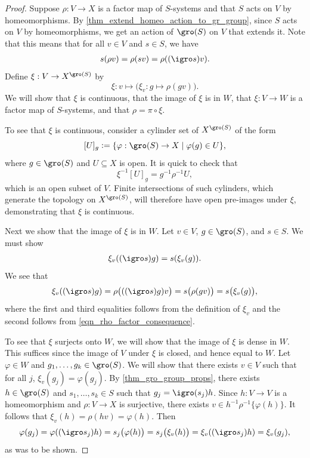 \begin{proof}
    Suppose $\rho: V \to X$ is a factor map of $S$-systems and that $S$ acts on $V$ by homeomorphisms.  By \cref{thm_extend_homeo_action_to_gr_group}, since $S$ acts on $V$ by homeomorphisms, we get an action of $\gro(S)$ on $V$ that extends it. Note that this means that for all $v \in V$ and $s \in S$, we have
    \begin{align}
        \label{eqn_rho_factor_consequence}
        s (\rho v) = \rho( sv) = \rho ( (\igro s) v).
    \end{align}
    Define $\xi: V \to X^{\gro(S)}$ by
    \[\xi: v \mapsto \big( \xi_v : g \mapsto \rho (g v) \big).\]
    We will show that $\xi$ is continuous, that the image of $\xi$ is in $W$, that $\xi: V \to W$ is a factor map of $S$-systems, and that $\rho = \pi \circ \xi$.

    To see that $\xi$ is continuous, consider a cylinder set of $X^{\gro(S)}$ of the form
    \[[U]_{g} \defeq \{\varphi: \gro(S) \to X \mid \varphi(g) \in U \},\]
    where $g \in \gro(S)$ and $U \subseteq X$ is open. It is quick to check that
    \[\xi^{-1} [U]_g = g^{-1} \rho^{-1} U,\]
    which is an open subset of $V$. Finite intersections of such cylinders, which generate the topology on $X^{\gro(S)}$, will therefore have open pre-images under $\xi$, demonstrating that $\xi$ is continuous.
    
    Next we show that the image of $\xi$ is in $W$. Let $v \in V$, $g \in \gro(S)$, and $s \in S$.  We must show
    \begin{align*}
        \xi_v((\igro s) g) = s ( \xi_v(g)).
    \end{align*}
    We see that
    \[\xi_v((\igro s) g) = \rho \big( ((\igro s) g) v\big) = s \big( \rho (gv) \big) = s \big( \xi_v(g) \big),\]
    where the first and third equalities follows from the definition of $\xi_v$ and the second follows from \eqref{eqn_rho_factor_consequence}.

    To see that $\xi$ surjects onto $W$, we will show that the image of $\xi$ is dense in $W$.  This suffices since the image of $V$ under $\xi$ is closed, and hence equal to $W$.  Let $\varphi \in W$ and $g_1, \ldots, g_k \in \gro(S)$.  We will show that there exists $v \in V$ such that for all $j$, $\xi_v(g_j) = \varphi(g_j)$. By \cref{thm_gro_group_props}, there exists $h \in \gro(S)$ and $s_1, \ldots, s_k \in S$ such that $g_j = \igro(s_j) h$.  Since $h: V \to V$ is a homeomorphism and $\rho: V \to X$ is surjective, there exists $v \in h^{-1} \rho^{-1} \{ \varphi(h) \}$.  It follows that $\xi_v(h) = \rho ( hv) = \varphi(h)$. Then
    \[\varphi(g_j) = \varphi((\igro s_j) h) = s_j \big(\varphi (h)\big) = s_j \big(\xi_v(h)\big) = \xi_v((\igro s_j) h) = \xi_v(g_j),\]
    as was to be shown.


\end{proof}
